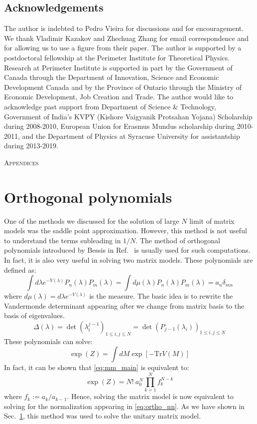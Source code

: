 \documentclass[11pt]{article}
\begin{document}
\subsection*{Acknowledgements}
The author is indebted to Pedro Vieira
for discussions and for encouragement. We thank Vladimir Kazakov 
and Zhechuag Zhang for email correspondence and for allowing us to use a 
figure from their paper. The author is supported by a postdoctoral fellowship 
at the Perimeter Institute for Theoretical Physics. Research at Perimeter Institute is supported 
in part by the Government of Canada through the Department of Innovation, Science and 
Economic Development Canada and by the Province of Ontario through 
the Ministry of Economic Development, Job Creation and Trade.
The author would like to acknowledge past support from 
Department of Science \& Technology, Government of India's KVPY
(Kishore Vaigyanik Protsahan Yojana) Scholarship during 2008-2010, 
European Union for Erasmus Mundus scholarship during 2010-2011, 
and the Department of Physics at Syracuse University for 
assistantship during 2013-2019. 
\newpage
\appendix
\begin{center} \Large{\textsc{Appendices}}\end{center}
\section{Orthogonal polynomials}
One of the methods we discussed for the solution of 
large $N$ limit of matrix models was the saddle point approximation. 
However, this method is not useful 
to understand the terms subleading in $1/N$. The method 
of orthogonal polynomials introduced by Bessis in Ref.~\cite{Bessis:1980ss} 
is usually used for such computations. In fact, it is also very useful in 
solving two matrix 
models. These polynomials are defined as:
\begin{equation}
	\label{eq:ortho_nn} 
	\int d\lambda e^{-V(\lambda)} P_{n}(\lambda)
	P_{m}(\lambda) = \int d \mu(\lambda) P_{n}(\lambda)
	P_{m}(\lambda) = a_{n} \delta_{mn} 
\end{equation}
where $d \mu(\lambda) = d\lambda e^{-V(\lambda)}$ is the measure. 
The basic idea is to rewrite the Vandermonde determinant appearing after we change from matrix basis to the basis of eigenvalues. 
\begin{equation}
	\Delta(\lambda) = \det(\lambda_{i}^{j-1})_{1 \le i, j \le N} = \det(P_{j-1}(\lambda_i))_{1 \le i, j \le N}
\end{equation}
These polynomials can solve:
\begin{equation}
	\label{eq:mm_main}
	\exp(Z) = \int dM \exp[-\mbox{Tr} V(M)] 
\end{equation}
In fact, it can be shown that \ref{eq:mm_main} is equivalent to:
\begin{equation}
	\exp(Z) = N! ~ a_{0}^{N} \prod_{k=1}^{N} f_{k}^{N-k}
\end{equation}
where $f_{k} := a_{k}/a_{k-1}$. 
Hence, solving the matrix model is now equivalent to solving for the 
normalization appearing in \ref{eq:ortho_nn}. As we have shown in Sec.~\ref{}, 
this method was used to solve the unitary 
matrix model.
\end{document}

